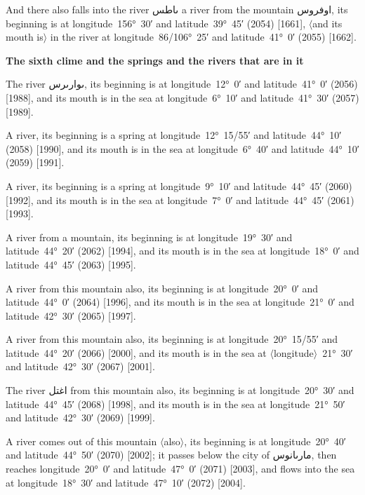 \documentclass[11pt]{article}
\newcommand{\Pg}[1]{\marginpar{\footnotesize #1}}
\newcommand{\Ang}[1]{\ensuremath{#1}}
\begin{document}
And there also falls into the river \textarabic{ٮاطس} a river from the mountain \textarabic{اوفروس}, its beginning is at longitude~156°~30′ and latitude~39°~45′ (2054) [1661], \Ang{\langle}and its mouth is\Ang{\rangle} in the river at longitude~86/106°~25′ and latitude~41°~0′ (2055) [1662].

\par\medskip\begin{center}\bfseries The sixth clime and the springs and the rivers that are in it\end{center}\par

The river \textarabic{ٮوارٮرس}, its beginning is at longitude~12°~0′ and latitude~41°~0′ (2056) [1988], and its mouth is in the sea at longitude~6°~10′ and latitude~41°~30′ (2057) [1989]\Pg{p. 136}.

A river, its beginning is a spring at longitude~12°~15/55′ and latitude~44°~10′ (2058) [1990], and its mouth is in the sea at longitude~6°~40′ and latitude~44°~10′ (2059) [1991].

A river, its beginning is a spring at longitude~9°~10′ and latitude~44°~45′ (2060) [1992], and its mouth is in the sea at longitude~7°~0′ and latitude~44°~45′ (2061) [1993].

A river from a mountain, its beginning is at longitude~19°~30′ and latitude~44°~20′ (2062) [1994], and its mouth is in the sea at longitude~18°~0′ and latitude~44°~45′ (2063) [1995].

A river from this mountain also, its beginning is at longitude~20°~0′ and latitude~44°~0′ (2064) [1996], and its mouth is in the sea at longitude~21°~0′ and latitude~42°~30′ (2065) [1997].

A river from this mountain also, its beginning is at longitude~20°~15/55′ and latitude~44°~20′ (2066) [2000], and its mouth is in the sea at \Ang{\langle}longitude\Ang{\rangle}~21°~30′ and latitude~42°~30′ (2067) [2001].

The river \textarabic{اغتل} from this mountain also, its beginning is at longitude~20°~30′ and latitude~44°~45′ (2068) [1998], and its mouth is in the sea at longitude~21°~50′ and latitude~42°~30′ (2069) [1999].

A river comes out of this mountain \Ang{\langle}also\Ang{\rangle}, its beginning is at longitude~20°~40′ and latitude~44°~50′ (2070) [2002]; it passes below the city of \textarabic{مارٮانوس}, then reaches longitude~20°~0′ and latitude~47°~0′ (2071) [2003], and flows into the sea at longitude~18°~30′ and latitude~47°~10′ (2072) [2004].
\end{document}
